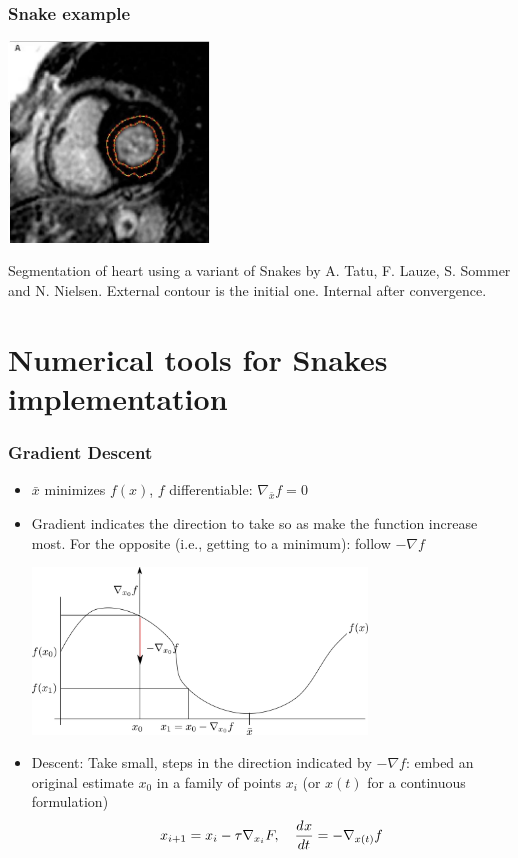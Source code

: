 \documentclass[10pt]{beamer}
\begin{document}
\begin{frame}
  \frametitle{Snake example}
  \begin{center}
    \includegraphics[width=0.4\textwidth]{IMAGES/heartgac}
  \end{center}
  Segmentation of heart using a variant of Snakes by A. Tatu,
  F. Lauze, S. Sommer and N. Nielsen. External contour is the initial
  one. Internal after convergence.
\end{frame}



\section{Numerical tools for Snakes implementation}





\begin{frame}
  \frametitle{Gradient Descent}
  \begin{itemize}
  \item $\bar{x}$ minimizes $f(x)$, $f$ differentiable: $\nabla_{\bar{x}} f = 0$
  \item Gradient indicates the direction to take so as make the
    function increase most. For the opposite (i.e., getting to a
    minimum): follow $-\nabla f$
    \begin{center}
      \includegraphics[width=0.7\textwidth]{FIGURES/graddesc}
    \end{center}
  \item Descent: Take small, steps in the direction indicated by $-\nabla f$:
    embed an original estimate $x_0$ in a family of
    points $x_i$ (or $x(t)$ for a continuous formulation)
    $$
    x_{i+1} = x_i - \tau\nabla_{x_i}F,\quad \frac{d^{}{x}}{d{t}^{}} = -\nabla_{x(t)}f
    $$
  \end{itemize}
\end{frame}
\end{document}
